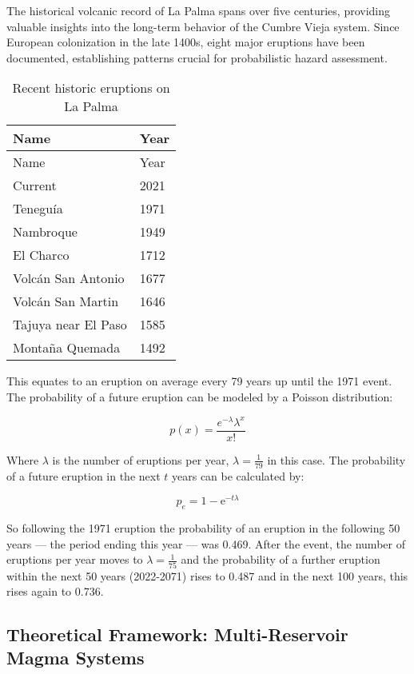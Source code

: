 \documentclass[
  letterpaper,
]{article}
\begin{document}
The historical volcanic record of La Palma spans over five centuries,
providing valuable insights into the long-term behavior of the Cumbre
Vieja system. Since European colonization in the late 1400s, eight major
eruptions have been documented, establishing patterns crucial for
probabilistic hazard assessment.

\begin{longtable}[]{@{}ll@{}}
\caption{Recent historic eruptions on La Palma}\tabularnewline
\toprule\noalign{}
Name & Year \\
\midrule\noalign{}
\endfirsthead
\toprule\noalign{}
Name & Year \\
\midrule\noalign{}
\endhead
\bottomrule\noalign{}
\endlastfoot
Current & 2021 \\
Teneguía & 1971 \\
Nambroque & 1949 \\
El Charco & 1712 \\
Volcán San Antonio & 1677 \\
Volcán San Martin & 1646 \\
Tajuya near El Paso & 1585 \\
Montaña Quemada & 1492 \\
\end{longtable}

This equates to an eruption on average every 79 years up until the 1971
event. The probability of a future eruption can be modeled by a Poisson
distribution:

\[
p(x)=\frac{e^{-\lambda} \lambda^{x}}{x !}
\]

Where \(\lambda\) is the number of eruptions per year,
\(\lambda=\frac{1}{79}\) in this case. The probability of a future
eruption in the next \(t\) years can be calculated by:

\[
p_e = 1-\mathrm{e}^{-t \lambda}
\]

So following the 1971 eruption the probability of an eruption in the
following 50 years --- the period ending this year --- was 0.469. After
the event, the number of eruptions per year moves to
\(\lambda=\frac{1}{75}\) and the probability of a further eruption
within the next 50 years (2022-2071) rises to 0.487 and in the next 100
years, this rises again to 0.736.

\subsection{Theoretical Framework: Multi-Reservoir Magma
Systems}\label{theoretical-framework-multi-reservoir-magma-systems}
\end{document}

